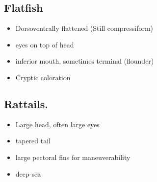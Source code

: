 \documentclass[11pt]{article}
\begin{document}
\subsection*{Flatfish}

	\begin{itemize}
		\item Dorsoventrally flattened (Still compressiform)
		\item eyes on top of head
		\item inferior mouth, sometimes terminal (flounder)
		\item Cryptic coloration
	\end{itemize}

\subsection*{Rattails.}

	\begin{itemize}
		\item Large head, often large eyes
		\item tapered tail
		\item large pectoral fins for maneuverability
		\item deep-sea
	\end{itemize}
\end{document}
